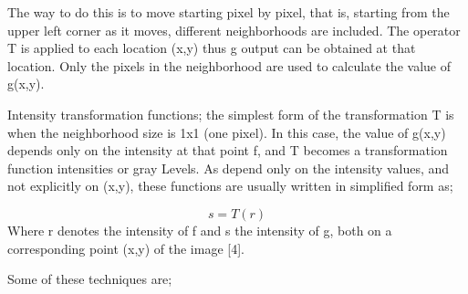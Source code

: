 The way to do this is to move starting pixel by pixel, that is, starting from the upper left corner as it moves, different neighborhoods are included. The operator T is applied to each location (x,y) thus g output can be obtained at that location. Only the pixels in the neighborhood are used to calculate the value of g(x,y).

Intensity transformation functions; the simplest form of the transformation T is when the neighborhood size is 1x1 (one pixel). In this case, the value of g(x,y) depends only on the intensity at that point f, and T becomes a transformation function intensities or gray Levels. As depend only on the intensity values, and not explicitly on (x,y), these functions are usually written in simplified form as;

\[
	s=T(r)
\]
Where r denotes the intensity of f and s the intensity of g, both on a corresponding point (x,y) of the image [4].

Some of these techniques are;

